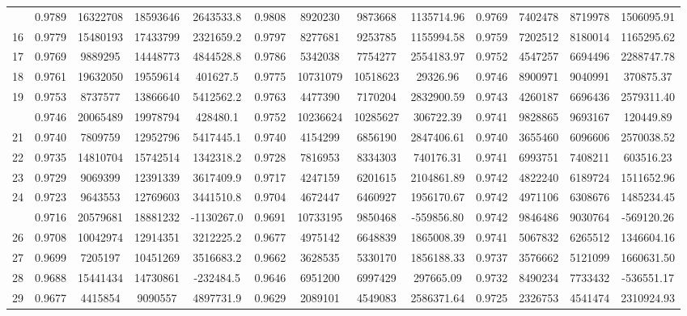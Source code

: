 \documentclass[
  12pt,
]{article}
\begin{document}
\begin{longtable}[t]{lcccccccccccc}
\addlinespace
15 & 0.9789 & 16322708 & 18593646 & 2643533.8 & 0.9808 & 8920230 & 9873668 & 1135714.96 & 0.9769 & 7402478 & 8719978 & 1506095.91\\
16 & 0.9779 & 15480193 & 17433799 & 2321659.2 & 0.9797 & 8277681 & 9253785 & 1155994.58 & 0.9759 & 7202512 & 8180014 & 1165295.62\\
17 & 0.9769 & 9889295 & 14448773 & 4844528.8 & 0.9786 & 5342038 & 7754277 & 2554183.97 & 0.9752 & 4547257 & 6694496 & 2288747.78\\
18 & 0.9761 & 19632050 & 19559614 & 401627.5 & 0.9775 & 10731079 & 10518623 & 29326.96 & 0.9746 & 8900971 & 9040991 & 370875.37\\
19 & 0.9753 & 8737577 & 13866640 & 5412562.2 & 0.9763 & 4477390 & 7170204 & 2832900.59 & 0.9743 & 4260187 & 6696436 & 2579311.40\\
\addlinespace
20 & 0.9746 & 20065489 & 19978794 & 428480.1 & 0.9752 & 10236624 & 10285627 & 306722.39 & 0.9741 & 9828865 & 9693167 & 120449.89\\
21 & 0.9740 & 7809759 & 12952796 & 5417445.1 & 0.9740 & 4154299 & 6856190 & 2847406.61 & 0.9740 & 3655460 & 6096606 & 2570038.52\\
22 & 0.9735 & 14810704 & 15742514 & 1342318.2 & 0.9728 & 7816953 & 8334303 & 740176.31 & 0.9741 & 6993751 & 7408211 & 603516.23\\
23 & 0.9729 & 9069399 & 12391339 & 3617409.9 & 0.9717 & 4247159 & 6201615 & 2104861.89 & 0.9742 & 4822240 & 6189724 & 1511652.96\\
24 & 0.9723 & 9643553 & 12769603 & 3441510.8 & 0.9704 & 4672447 & 6460927 & 1956170.67 & 0.9742 & 4971106 & 6308676 & 1485234.45\\
\addlinespace
25 & 0.9716 & 20579681 & 18881232 & -1130267.0 & 0.9691 & 10733195 & 9850468 & -559856.80 & 0.9742 & 9846486 & 9030764 & -569120.26\\
26 & 0.9708 & 10042974 & 12914351 & 3212225.2 & 0.9677 & 4975142 & 6648839 & 1865008.39 & 0.9741 & 5067832 & 6265512 & 1346604.16\\
27 & 0.9699 & 7205197 & 10451269 & 3516683.2 & 0.9662 & 3628535 & 5330170 & 1856188.33 & 0.9737 & 3576662 & 5121099 & 1660631.50\\
28 & 0.9688 & 15441434 & 14730861 & -232484.5 & 0.9646 & 6951200 & 6997429 & 297665.09 & 0.9732 & 8490234 & 7733432 & -536551.17\\
29 & 0.9677 & 4415854 & 9090557 & 4897731.9 & 0.9629 & 2089101 & 4549083 & 2586371.64 & 0.9725 & 2326753 & 4541474 & 2310924.93\\

\end{longtable}
\end{document}
